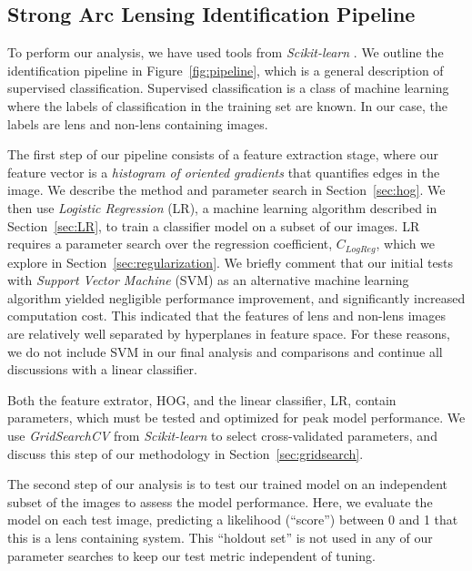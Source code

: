 \documentclass{emulateapj}
\begin{document}
\subsection{Strong Arc Lensing Identification Pipeline}

To perform our analysis, we have used tools from {\em Scikit-learn}
\citep{pedregosa_etal12}.  We outline the identification pipeline in
Figure~\ref{fig:pipeline}, which is a general description of
supervised classification.  Supervised classification is a class of
machine learning where the labels of classification in the training
set are known.  In our case, the labels are lens and non-lens
containing images.

The first step of our pipeline consists of a feature extraction stage,
where our feature vector is a {\em histogram of oriented gradients}
\citep{dalalandtriggs_05} that quantifies edges in the image.  We
describe the method and parameter search in Section~\ref{sec:hog}.  We
then use {\em Logistic Regression} (LR), a machine learning algorithm
described in Section~\ref{sec:LR}, to train a classifier model on a
subset of our images.  LR requires a parameter search over the
regression coefficient, $C_{LogReg}$, which we explore in
Section~\ref{sec:regularization}.  We briefly comment that our initial
tests with {\em Support Vector Machine} (SVM) as an alternative
machine learning algorithm yielded negligible performance improvement,
and significantly increased computation cost.  This indicated that the
features of lens and non-lens images are relatively well separated by
hyperplanes in feature space.  For these reasons, we do not include
SVM in our final analysis and comparisons and continue all discussions
with a linear classifier.

Both the feature extrator, HOG, and the linear classifier, LR, contain
parameters, which must be tested and optimized for peak model
performance.  We use {\em GridSearchCV} from {\em Scikit-learn} to
select cross-validated parameters, and discuss this step of our
methodology in Section~\ref{sec:gridsearch}.

The second step of our analysis is to test our trained model on an
independent subset of the images to assess the model performance.
Here, we evaluate the model on each test image, predicting a
likelihood (``score'') between 0 and 1 that this is a lens containing
system.  This ``holdout set'' is not used in any of our parameter
searches to keep our test metric independent of tuning.
\end{document}
